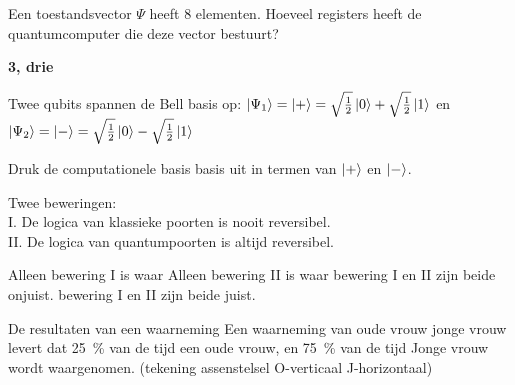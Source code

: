 \documentclass[a4paper, addpoints, 12pt
    , noanswers    %
    ]{exam}
\begin{document}
\begin{questions}
\question[1]
Een toestandsvector $\Psi$ heeft 8 elementen. Hoeveel registers heeft de quantumcomputer die deze vector bestuurt?

\ifprintanswers
\textbf{3, drie}
\else
\fillwithlines{.5in}
\fi


\question[1]
Twee qubits spannen de Bell basis op: $\ket{\Psi_1} = \ket{+}= \sqrt{\tfrac{1}{2}}\ket{0}+ \sqrt{\tfrac{1}{2}}\ket{1}$ en 
$\ket{\Psi_2}= \ket{-} = \sqrt{\tfrac{1}{2}}\ket{0}- \sqrt{\tfrac{1}{2}}\ket{1}$

Druk de computationele basis basis uit in termen van $\ket{+}$ en $\ket{-}$.

\question[1] Twee beweringen:\\
I. De logica van klassieke poorten is nooit reversibel.\\
II. De logica van quantumpoorten is altijd reversibel.

\begin{choices}
\choice Alleen bewering I is waar
\correctchoice Alleen bewering II is waar
\choice bewering I en II zijn beide onjuist.
\choice bewering I en II zijn beide juist.
\end{choices}



De resultaten van een waarneming
Een waarneming van oude vrouw jonge vrouw levert dat \SI{25}{\percent} van de tijd een oude vrouw, en \SI{75}{\percent} van de tijd Jonge vrouw wordt waargenomen.
(tekening assenstelsel O-verticaal J-horizontaal)

\end{questions}
\end{document}
